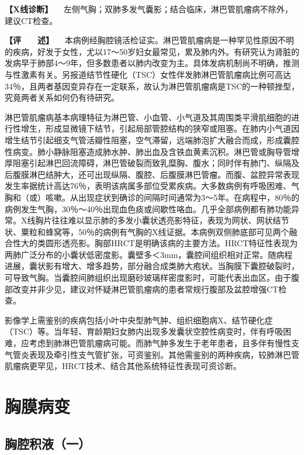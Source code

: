 \textbf{【X线诊断】}
　左侧气胸；双肺多发气囊影；结合临床，淋巴管肌瘤病不除外，建议CT检查。

\textbf{【评　　述】}
　本病例经胸腔镜活检证实。淋巴管肌瘤病是一种罕见性原因不明的疾病，好发于女性，尤以17～50岁妇女最常见，累及肺内外。有研究认为肾脏的发病早于肺部4～9年，但多数患者以肺内改变为主。具体发病机制尚不明确，推测与性激素有关。另报道结节性硬化（TSC）女性伴发肺淋巴管肌瘤病比例可高达34％，且两者基因变异存在一定联系，故认为淋巴管肌瘤病是TSC的一种顿挫型，究竟两者关系如何仍有待研究。

淋巴管肌瘤病基本病理特征为淋巴管、小血管、小气道及其周围类平滑肌细胞的进行性增生，形成显微镜下结节，引起局部管腔结构的狭窄或阻塞。在肺内小气道因增生结节引起细支气管活瓣性阻塞，空气滞留，远端肺泡扩大融合而成，形成囊腔性病变。肺小静脉阻塞造成肺水肿、肺出血及含铁血黄素沉积。淋巴管或胸导管增厚阻塞引起淋巴回流障碍，淋巴管破裂而致乳糜胸、腹水；同时伴有肺门、纵隔及后腹膜淋巴结肿大，还可出现纵隔、腹腔、后腹膜淋巴管瘤。而腹、盆腔异常表现发生率据统计高达76％，表明该病属多部位受累疾病。大多数病例有呼吸困难、气胸和（或）咳嗽。从出现症状到确诊的间隔时间通常为3～5年。在病程中，80％的病例发生气胸，30％～40％出现血色痰或间歇性咯血。几乎全部病例都有肺功能异常。X线胸片往往难以显示肺的多发小囊状透亮影特征，表现为网状、网状结节状、粟粒和蜂窝等，50％的病例有气胸的X线证据。本病例双侧肺底部可见两个融合性大的类圆形透亮影。胸部HRCT是明确该病的主要方法。HRCT特征性表现为两肺广泛分布的小囊状低密度影。囊壁多＜3mm，囊腔间组织相对正常。随病程进展，囊状影有增大、增多趋势，部分融合成类肺大疱状。当胸膜下囊腔破裂时，可导致气胸。当囊腔间肺组织出现磨砂玻璃样密度影时，可能代表出血区。由于腹部改变并非少见，建议对怀疑淋巴管肌瘤病的患者常规行腹部及盆腔增强CT检查。

影像学上需鉴别的疾病包括小叶中央型肺气肿、组织细胞病X、结节硬化症（TSC）等。当年轻、育龄期妇女肺内出现多发囊状空腔性病变时，伴有呼吸困难，应考虑到肺淋巴管肌瘤病可能。而肺气肿多发生于老年患者，且多伴有慢性支气管炎表现及牵引性支气管扩张，可资鉴别。其他需鉴别的两种疾病，较肺淋巴管肌瘤病更罕见，HRCT技术、结合其他系统特征性表现可资诊断。

\section{胸膜病变}

\subsection{胸腔积液（一）}

